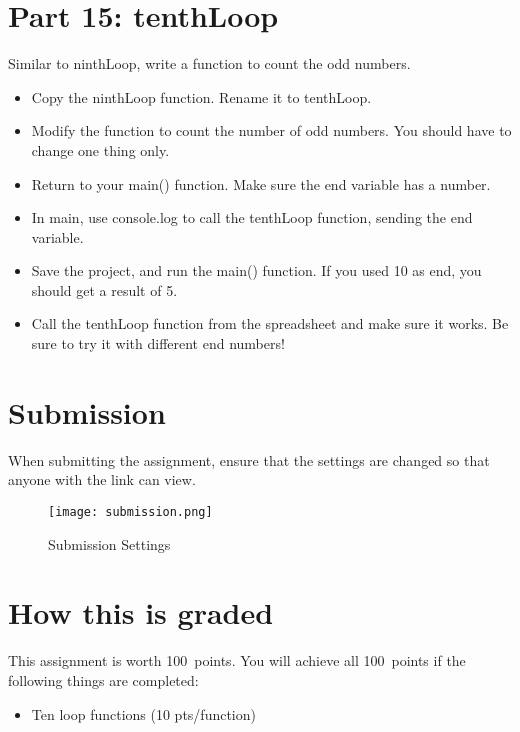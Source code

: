 \documentclass{article}
\newcommand{\AValue}{100}
\begin{document}
\section*{Part 15: tenthLoop}
Similar to ninthLoop, write a function to count the odd numbers.
\begin{itemize}
	\item Copy the ninthLoop function.  Rename it to tenthLoop.
	\item Modify the function to count the number of odd numbers.  You should have to change one thing only.
	\item Return to your main() function.  Make sure the end variable has a number.
	\item In main, use console.log to call the tenthLoop function, sending the end variable.
	\item Save the project, and run the main() function.  If you used 10 as end, you should get a result of 5.
	\item Call the tenthLoop function from the spreadsheet and make sure it works.  Be sure to try it with different end numbers!
\end{itemize}

\section*{Submission}
When submitting the assignment, ensure that the settings are changed so that anyone with the link can view.
\begin{figure}[H]
  \centering
  \texttt{[image: submission.png]}
  \caption{Submission Settings}
\end{figure}

\section*{How this is graded}
This assignment is worth \AValue \ points. You will achieve all \AValue \   points if the following things are completed:
\begin{itemize}
    \item Ten loop functions (10 pts/function)
\end{itemize}
\end{document}
